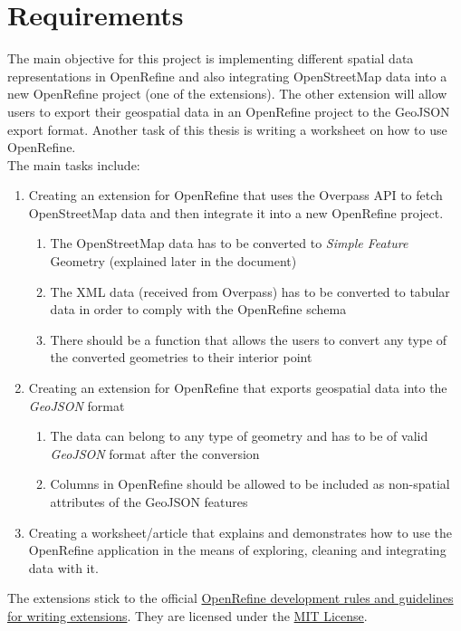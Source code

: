 \section{Requirements}
The main objective for this project is implementing different spatial data representations in OpenRefine and also integrating OpenStreetMap data into
a new OpenRefine project (one of the extensions). The other extension will allow users to export their geospatial data in an OpenRefine project to the GeoJSON export format. Another task of this thesis is writing a worksheet on how to use OpenRefine.\\
\newline
The main tasks include:
\begin{enumerate}
   \item Creating an extension for OpenRefine that uses the Overpass API to fetch OpenStreetMap data and then integrate it into a new OpenRefine project.
    \begin{enumerate}
    	\item The OpenStreetMap data has to be converted to \textit{Simple Feature} Geometry (explained later in the document)
    	\item The XML data (received from Overpass) has to be converted to tabular data in order to comply with the OpenRefine schema
    	\item There should be a function that allows the users to convert any type of the converted geometries to their interior point
    \end{enumerate} 
   \item Creating an extension for OpenRefine that exports geospatial data into the \textit{GeoJSON} format
   \begin{enumerate}
   		\item The data can belong to any type of geometry and has to be of valid \textit{GeoJSON} format after the conversion
   		\item Columns in OpenRefine should be allowed to be included as non-spatial attributes of the GeoJSON features
   \end{enumerate}
    \item Creating a worksheet/article that explains and demonstrates how to use the OpenRefine application in the means of exploring, cleaning and integrating data with it.
\end{enumerate}
The extensions stick to the official \href{https://docs.openrefine.org/technical-reference/writing-extensions}{OpenRefine development rules and guidelines for writing extensions}. They are licensed
under the \href{https://opensource.org/licenses/MIT}{MIT License}.
\pagebreak
